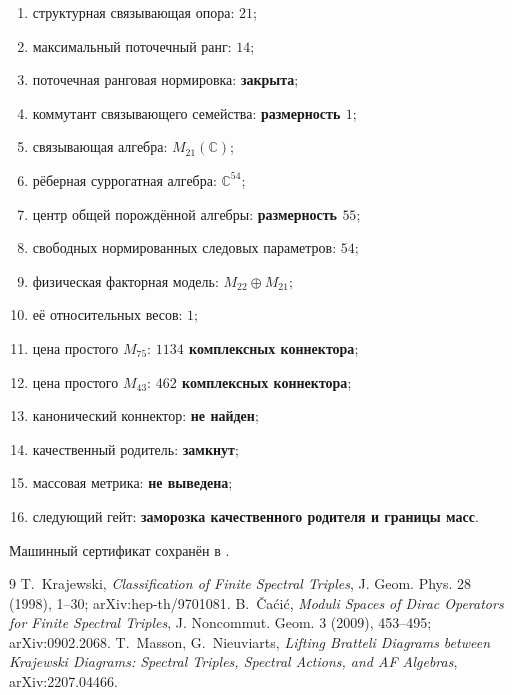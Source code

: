 \begin{protocol}
\begin{enumerate}
 \item структурная связывающая опора: \textbf{$21$};
 \item максимальный поточечный ранг: \textbf{$14$};
 \item поточечная ранговая нормировка: \textbf{закрыта};
 \item коммутант связывающего семейства: \textbf{размерность $1$};
 \item связывающая алгебра: \textbf{$M_{21}(\mathbb C)$};
 \item рёберная суррогатная алгебра: \textbf{$\mathbb C^{54}$};
 \item центр общей порождённой алгебры: \textbf{размерность $55$};
 \item свободных нормированных следовых параметров: \textbf{$54$};
 \item физическая факторная модель: \textbf{$M_{22}\oplus M_{21}$};
 \item её относительных весов: \textbf{$1$};
 \item цена простого $M_{75}$: \textbf{$1134$ комплексных коннектора};
 \item цена простого $M_{43}$: \textbf{$462$ комплексных коннектора};
 \item канонический коннектор: \textbf{не найден};
 \item качественный родитель: \textbf{замкнут};
 \item массовая метрика: \textbf{не выведена};
 \item следующий гейт: \textbf{заморозка качественного родителя и границы масс}.
\end{enumerate}
\end{protocol}

Машинный сертификат сохранён в
.

\begin{thebibliography}{9}
T.~Krajewski,
\emph{Classification of Finite Spectral Triples},
J. Geom. Phys. 28 (1998), 1--30; arXiv:hep-th/9701081.
B.~\v{C}a\'ci\'c,
\emph{Moduli Spaces of Dirac Operators for Finite Spectral Triples},
J. Noncommut. Geom. 3 (2009), 453--495; arXiv:0902.2068.
T.~Masson, G.~Nieuviarts,
\emph{Lifting Bratteli Diagrams between Krajewski Diagrams: Spectral
Triples, Spectral Actions, and AF Algebras}, arXiv:2207.04466.
\end{thebibliography}